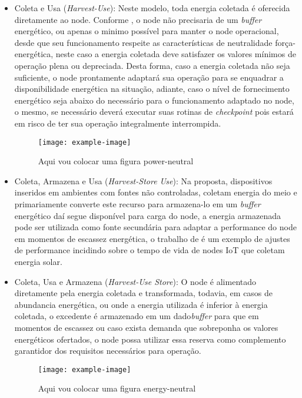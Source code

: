 \begin{itemize}
    \item Coleta e Usa (\textit{Harvest-Use}): Neste modelo, toda energia coletada é oferecida diretamente ao node. Conforme \cite{merrett_energy-driven_2017}, o node não precisaria de um \textit{buffer} energético, ou apenas o minimo possível para manter o node operacional, desde que seu funcionamento respeite as características de neutralidade força-energética, neste caso a energia coletada deve satisfazer os valores mínimos de operação plena ou depreciada. Desta forma, caso a energia coletada não seja suficiente, o node prontamente adaptará sua operação para se enquadrar a disponibilidade energética na situação, adiante, caso o nível de fornecimento energético seja abaixo do necessário para o funcionamento adaptado no node, o mesmo, se necessário deverá executar suas rotinas de \textit{checkpoint} pois estará em risco de ter sua operação integralmente interrompida.
    
	\begin{figure}[h]
			\centering
			\noindent\texttt{[image: example-image]} 
			\caption{Aqui vou colocar uma figura power-neutral}	
	\end{figure}   
    
    \item Coleta, Armazena e Usa (\textit{Harvest-Store Use}): Na proposta, dispositivos inseridos em ambientes com fontes não controladas, coletam energia do meio e primariamente converte este recurso para armazena-lo em um \textit{buffer} energético daí segue disponível para carga do node, a energia armazenada pode ser utilizada como fonte secundária para adaptar a performance do node em momentos de escassez energética, o trabalho de \cite{Lee2018-iz} é um exemplo de ajustes de performance incidindo sobre o tempo de vida de nodes \ac{IoT} que coletam energia solar.
    \item Coleta, Usa e Armazena (\textit{Harvest-Use Store}): O node é alimentado diretamente pela energia coletada e transformada, todavia, em casos de abundancia energética, ou onde a energia utilizada é inferior à energia coletada, o excedente é armazenado em um dado\textit{buffer} para que em momentos de escassez ou caso exista demanda que sobreponha os valores energéticos ofertados, o node possa utilizar essa reserva como complemento garantidor dos requisitos necessários para operação.
    
    \begin{figure}[h]
    	\centering
    	\noindent\texttt{[image: example-image]} 
    	\caption{Aqui vou colocar uma figura energy-neutral}	
   	\end{figure}  
    
\end{itemize}

